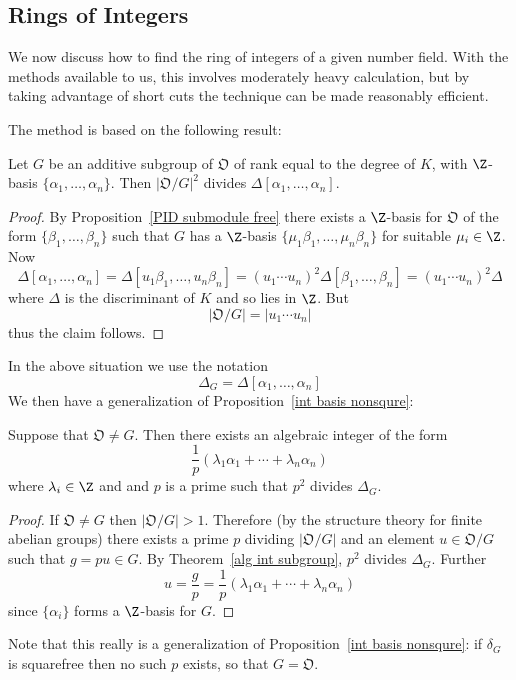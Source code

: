 \subsection{Rings of Integers}
We now discuss how to find the ring of integers of a given number field.
With the methods available to us, this involves moderately heavy calculation,
but by taking advantage of short cuts the technique can be made reasonably efficient.\par
The method is based on the following result:
\begin{theorem}\label{alg int subgroup}
Let $G$ be an additive subgroup of $\mathfrak{O}$ of rank equal to the degree of $K$, with $\Z$-basis $\{\alpha_1,\dots,\alpha_n\}$. Then $|\mathfrak{O}/G|^2$ divides $\Delta[\alpha_1,\dots,\alpha_n]$.
\end{theorem}
\begin{proof}
By Proposition~\ref{PID submodule free} there exists a $\Z$-basis for $\mathfrak{O}$ of the form $\{\beta_1,\dots,\beta_n\}$ such that $G$ has a $\Z$-basis $\{\mu_1\beta_1,\dots,\mu_n\beta_n\}$ for suitable $\mu_i\in\Z$. Now
\[\Delta[\alpha_1,\dots,\alpha_n]=\Delta[u_1\beta_1,\dots,u_n\beta_n]=(u_1\cdots u_n)^2\Delta[\beta_1,\dots,\beta_n]=(u_1\cdots u_n)^2\Delta\]
where $\Delta$ is the discriminant of $K$ and so lies in $\Z$. But
\[|\mathfrak{O}/G|=|u_1\cdots u_n|\]
thus the claim follows.
\end{proof}
In the above situation we use the notation
\[\Delta_G=\Delta[\alpha_1,\dots,\alpha_n]\]
We then have a generalization of Proposition~\ref{int basis nonsqure}:
\begin{proposition}\label{alg int proper sub}
Suppose that $\mathfrak{O}\neq G$. Then there exists an algebraic integer of the form
\[\frac{1}{p}(\lambda_1\alpha_1+\cdots+\lambda_n\alpha_n)\]
where $\lambda_i\in\Z$ and and $p$ is a prime such that $p^2$ divides $\Delta_G$.
\end{proposition}
\begin{proof}
If $\mathfrak{O}\neq G$ then $|\mathfrak{O}/G|>1$. Therefore (by the structure theory for finite abelian groups) there exists a prime $p$ dividing $|\mathfrak{O}/G|$ and an element $u\in\mathfrak{O}/G$ such that $g=pu\in G$. By Theorem~\ref{alg int subgroup}, $p^2$ divides $\Delta_G$. Further
\[u=\frac{g}{p}=\frac{1}{p}(\lambda_1\alpha_1+\cdots+\lambda_n\alpha_n)\]
since $\{\alpha_i\}$ forms a $\Z$-basis for $G$.
\end{proof}
Note that this really is a generalization of Proposition~\ref{int basis nonsqure}: if $\delta_G$ is squarefree then no such $p$ exists, so that $G=\mathfrak{O}$.
